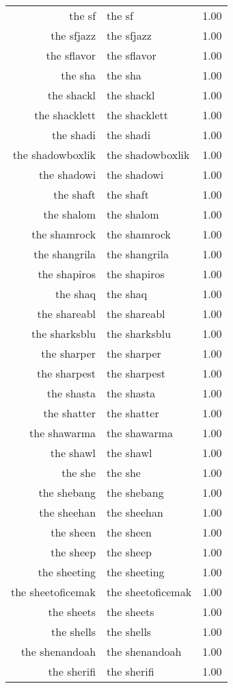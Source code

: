 \begin{table}[ht]
\begin{tabular}{rlr}
  the sf & the sf & 1.00 \\ 
  the sfjazz & the sfjazz & 1.00 \\ 
  the sflavor & the sflavor & 1.00 \\ 
  the sha & the sha & 1.00 \\ 
  the shackl & the shackl & 1.00 \\ 
  the shacklett & the shacklett & 1.00 \\ 
  the shadi & the shadi & 1.00 \\ 
  the shadowboxlik & the shadowboxlik & 1.00 \\ 
  the shadowi & the shadowi & 1.00 \\ 
  the shaft & the shaft & 1.00 \\ 
  the shalom & the shalom & 1.00 \\ 
  the shamrock & the shamrock & 1.00 \\ 
  the shangrila & the shangrila & 1.00 \\ 
  the shapiros & the shapiros & 1.00 \\ 
  the shaq & the shaq & 1.00 \\ 
  the shareabl & the shareabl & 1.00 \\ 
  the sharksblu & the sharksblu & 1.00 \\ 
  the sharper & the sharper & 1.00 \\ 
  the sharpest & the sharpest & 1.00 \\ 
  the shasta & the shasta & 1.00 \\ 
  the shatter & the shatter & 1.00 \\ 
  the shawarma & the shawarma & 1.00 \\ 
  the shawl & the shawl & 1.00 \\ 
  the she & the she & 1.00 \\ 
  the shebang & the shebang & 1.00 \\ 
  the sheehan & the sheehan & 1.00 \\ 
  the sheen & the sheen & 1.00 \\ 
  the sheep & the sheep & 1.00 \\ 
  the sheeting & the sheeting & 1.00 \\ 
  the sheetoficemak & the sheetoficemak & 1.00 \\ 
  the sheets & the sheets & 1.00 \\ 
  the shells & the shells & 1.00 \\ 
  the shenandoah & the shenandoah & 1.00 \\ 
  the sherifi & the sherifi & 1.00 \\ 

\end{tabular}
\end{table}
